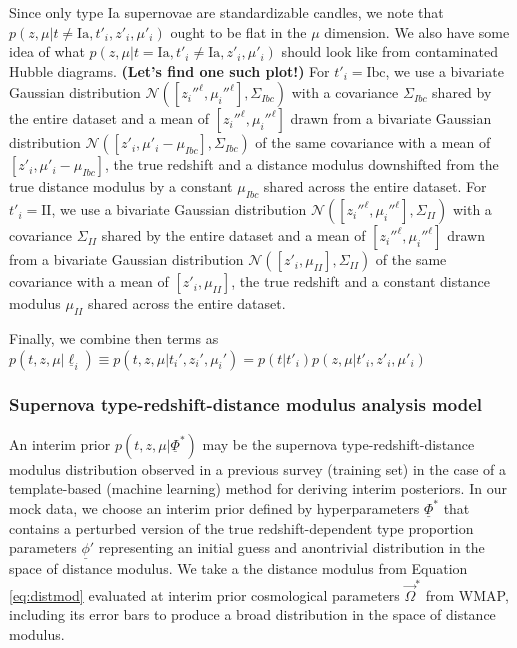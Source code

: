 \documentclass[12pt, onecolumn]{emulateapj}
\newcommand{\textul}{\underline}
\begin{document}
Since only type Ia supernovae are standardizable candles, we note that $p(z, \mu | t\neq\mathrm{Ia}, t'_{i}, z'_{i}, \mu'_{i})$ ought to be flat in the $\mu$ dimension.  We also have some idea of what $p(z, \mu | t=\mathrm{Ia}, t'_{i}\neq\mathrm{Ia}, z'_{i}, \mu'_{i})$ should look like from contaminated Hubble diagrams.  \textbf{(Let's find one such plot!)}  For $t'_{i}=\mathrm{Ibc}$, we use a bivariate Gaussian distribution $\mathcal{N}([z_{i}''^{\ell}, \mu_{i}''^{\ell}], \Sigma_{Ibc})$ with a covariance $\Sigma_{Ibc}$ shared by the entire dataset and a mean of $[z_{i}''^{\ell}, \mu_{i}''^{\ell}]$ drawn from a bivariate Gaussian distribution $\mathcal{N}([z'_{i}, \mu'_{i}-\mu_{Ibc}], \Sigma_{Ibc})$ of the same covariance with a mean of $[z'_{i}, \mu'_{i}-\mu_{Ibc}]$, the true redshift and a distance modulus downshifted from the true distance modulus by a constant $\mu_{Ibc}$ shared across the entire dataset.    For $t'_{i}=\mathrm{II}$, we use a bivariate Gaussian distribution $\mathcal{N}([z_{i}''^{\ell}, \mu_{i}''^{\ell}], \Sigma_{II})$ with a covariance $\Sigma_{II}$ shared by the entire dataset and a mean of $[z_{i}''^{\ell}, \mu_{i}''^{\ell}]$ drawn from a bivariate Gaussian distribution $\mathcal{N}([z'_{i}, \mu_{II}], \Sigma_{II})$ of the same covariance with a mean of $[z'_{i}, \mu_{II}]$, the true redshift and a constant distance modulus $\mu_{II}$  shared across the entire dataset.  

Finally, we combine then terms as $p(t, z, \mu | \textul{\ell}_{i})\equiv p(t, z, \mu | t_{i}', z_{i}', \mu_{i}')=p(t | t'_{i})p(z, \mu | t'_{i}, z'_{i}, \mu'_{i})$

\subsubsection{Supernova type-redshift-distance modulus analysis model}
\label{sec:snlcinterim}

An interim prior $p(t, z, \mu | \textul{\Phi}^{*})$ may be the supernova type-redshift-distance modulus distribution observed in a previous survey (training set) in the case of a template-based (machine learning) method for deriving interim posteriors.  In our mock data, we choose an interim prior defined by hyperparameters $\textul{\Phi}^{*}$ that contains a perturbed version of the true redshift-dependent type proportion parameters $\textul{\phi}'$ representing an initial guess and anontrivial distribution in the space of distance modulus.  We take a the distance modulus from Equation \ref{eq:distmod} evaluated at interim prior cosmological parameters $\vec{\Omega}^{*}$ from WMAP, including its error bars to produce a broad distribution in the space of distance modulus.
\end{document}
